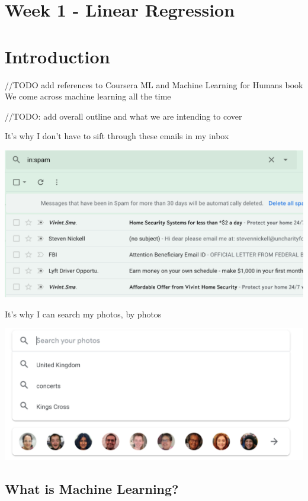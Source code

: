\documentclass[12pt]{article}
\begin{document}
\section{Week 1 - Linear Regression}
\section{Introduction}

//TODO add references to Coursera ML and Machine Learning for Humans book
We come across  machine learning all the time 

//TODO: add overall outline and what we are intending to cover

It's why I don't have to sift through these emails in my inbox

\includegraphics[width=\textwidth]{spam}

It's why I can search my photos, by photos

\includegraphics[width=\textwidth]{photo-search}

\subsection{What is Machine Learning?}
\end{document}

